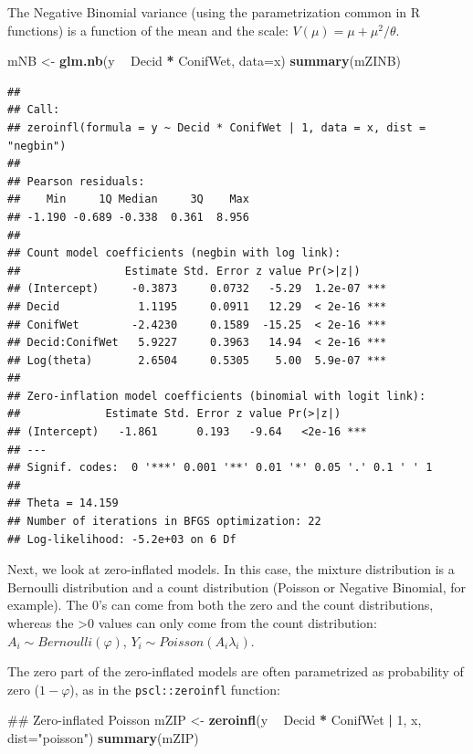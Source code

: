 \documentclass[12pt,]{book}
\newenvironment{Shaded}{\begin{snugshade}}{\end{snugshade}}
\newcommand{\DataTypeTok}[1]{\textcolor[rgb]{0.13,0.29,0.53}{#1}}
\newcommand{\DecValTok}[1]{\textcolor[rgb]{0.00,0.00,0.81}{#1}}
\newcommand{\KeywordTok}[1]{\textcolor[rgb]{0.13,0.29,0.53}{\textbf{#1}}}
\newcommand{\NormalTok}[1]{#1}
\newcommand{\OperatorTok}[1]{\textcolor[rgb]{0.81,0.36,0.00}{\textbf{#1}}}
\newcommand{\StringTok}[1]{\textcolor[rgb]{0.31,0.60,0.02}{#1}}
\begin{document}
The Negative Binomial variance (using the parametrization common in R functions)
is a function of the mean and the scale: \(V(\mu) = \mu + \mu^2/\theta\).

\begin{Shaded}
\begin{Highlighting}[]
\NormalTok{mNB <-}\StringTok{ }\KeywordTok{glm.nb}\NormalTok{(y }\OperatorTok{~}\StringTok{ }\NormalTok{Decid }\OperatorTok{*}\StringTok{ }\NormalTok{ConifWet, }\DataTypeTok{data=}\NormalTok{x)}
\KeywordTok{summary}\NormalTok{(mZINB)}
\end{Highlighting}
\end{Shaded}

\begin{verbatim}
## 
## Call:
## zeroinfl(formula = y ~ Decid * ConifWet | 1, data = x, dist = "negbin")
## 
## Pearson residuals:
##    Min     1Q Median     3Q    Max 
## -1.190 -0.689 -0.338  0.361  8.956 
## 
## Count model coefficients (negbin with log link):
##                Estimate Std. Error z value Pr(>|z|)    
## (Intercept)     -0.3873     0.0732   -5.29  1.2e-07 ***
## Decid            1.1195     0.0911   12.29  < 2e-16 ***
## ConifWet        -2.4230     0.1589  -15.25  < 2e-16 ***
## Decid:ConifWet   5.9227     0.3963   14.94  < 2e-16 ***
## Log(theta)       2.6504     0.5305    5.00  5.9e-07 ***
## 
## Zero-inflation model coefficients (binomial with logit link):
##             Estimate Std. Error z value Pr(>|z|)    
## (Intercept)   -1.861      0.193   -9.64   <2e-16 ***
## ---
## Signif. codes:  0 '***' 0.001 '**' 0.01 '*' 0.05 '.' 0.1 ' ' 1 
## 
## Theta = 14.159 
## Number of iterations in BFGS optimization: 22 
## Log-likelihood: -5.2e+03 on 6 Df
\end{verbatim}

Next, we look at zero-inflated models.
In this case, the mixture distribution is a Bernoulli distribution
and a count distribution (Poisson or Negative Binomial, for example).
The 0's can come from both the zero and the count distributions,
whereas the \textgreater{}0 values can only come from the count distribution:
\(A_i \sim Bernoulli(\varphi)\), \(Y_i \sim Poisson(A_i \lambda_i)\).

The zero part of the zero-inflated models are often parametrized
as probability of zero (\(1-\varphi\)), as in the \texttt{pscl::zeroinfl} function:

\begin{Shaded}
\begin{Highlighting}[]
\NormalTok{## Zero-inflated Poisson}
\NormalTok{mZIP <-}\StringTok{ }\KeywordTok{zeroinfl}\NormalTok{(y }\OperatorTok{~}\StringTok{ }\NormalTok{Decid }\OperatorTok{*}\StringTok{ }\NormalTok{ConifWet }\OperatorTok{|}\StringTok{ }\DecValTok{1}\NormalTok{, x, }\DataTypeTok{dist=}\StringTok{"poisson"}\NormalTok{)}
\KeywordTok{summary}\NormalTok{(mZIP)}
\end{Highlighting}
\end{Shaded}
\end{document}
